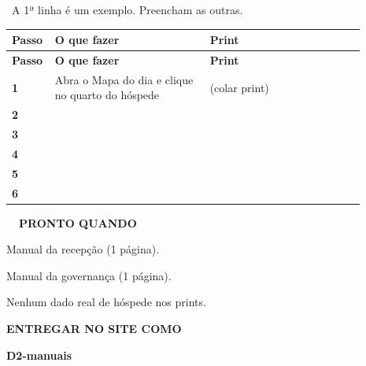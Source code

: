\documentclass[11pt,a4paper]{article}
\newcommand{\rotulo}[2]{\Needspace{6\baselineskip}\vspace{10pt}%
  \noindent{\color{cor}\normalsize #1}\hspace{6pt}{\footnotesize\bfseries\color{cor}\MakeUppercase{#2}}\par\vspace{2pt}}
\begin{document}
\rotulo{\faPen}{Para preencher}
{\footnotesize\color{cinza}\faHandPointDown\ A 1ª linha é um exemplo. Preencham as outras.}\par\vspace{2pt}
\begingroup\small
\begin{longtable}{>{\raggedright\arraybackslash}p{0.058\linewidth}>{\raggedright\arraybackslash}p{0.417\linewidth}>{\raggedright\arraybackslash}p{0.417\linewidth}}
\rowcolor{cor} \color{white}\textbf{\footnotesize Passo} & \color{white}\textbf{\footnotesize O que fazer} & \color{white}\textbf{\footnotesize Print} \\
\endfirsthead
\rowcolor{cor} \color{white}\textbf{\footnotesize Passo} & \color{white}\textbf{\footnotesize O que fazer} & \color{white}\textbf{\footnotesize Print} \\
\endhead
\rowcolor{white}\textbf{1} & Abra o Mapa do dia e clique no quarto do hóspede & (colar print) \\ \hline
\rowcolor{suave!55}\rule{0pt}{24pt}\textbf{2} &  &  \\ \hline
\rowcolor{white}\rule{0pt}{24pt}\textbf{3} &  &  \\ \hline
\rowcolor{suave!55}\rule{0pt}{24pt}\textbf{4} &  &  \\ \hline
\rowcolor{white}\rule{0pt}{24pt}\textbf{5} &  &  \\ \hline
\rowcolor{suave!55}\rule{0pt}{24pt}\textbf{6} &  &  \\ \hline
\end{longtable}
\endgroup
\begin{lrbox}{\blocofinal}\begin{minipage}{\linewidth}
\begin{tcolorbox}[enhanced,colback=suave!45,colframe=cor!35,boxrule=0.8pt,arc=8pt,left=10pt,right=10pt,top=8pt,bottom=8pt,before skip=0pt,after skip=0pt]
\begin{minipage}[t]{0.56\linewidth}\vspace{0pt}
{\footnotesize\bfseries\color{cor}\faCheckDouble\ \ PRONTO QUANDO}\par\vspace{2pt}
\begin{checklist}
  \item Manual da recepção (1 página).
  \item Manual da governança (1 página).
  \item Nenhum dado real de hóspede nos prints.
\end{checklist}
\end{minipage}\hfill
\begin{minipage}[t]{0.40\linewidth}\vspace{0pt}
\begin{selo}\centering
{\LARGE\color{cor}\faUpload}\par\vspace{3pt}
{\scriptsize\bfseries\color{cor}ENTREGAR NO SITE COMO}\par\vspace{2pt}
{\bfseries D2-manuais}
\end{selo}
\end{minipage}
\end{tcolorbox}
\end{minipage}\end{lrbox}
\end{document}
